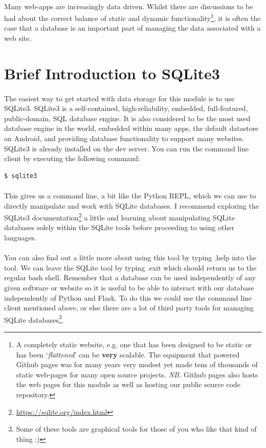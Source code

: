\documentclass[12pt, a4paper, oneside]{book}
\begin{document}
\paragraph{} Many web-apps are increasingly data driven. Whilst there are discussions to be had about the correct balance of static and dynamic functionality\footnote{A completely static website, e.g. one that has been designed to be static or has been `\emph{flattened}' can be {\bf{very}} scalable. The equipment that powered Github pages was for many years very modest yet made tens of thousands of static web-pages for many open source projects. \emph{NB.} Github pages also hosts the web pages for this module as well as hosting our public source code repository.}, it is often the case that a database is an important part of managing the data associated with a web site.

\section{Brief Introduction to SQLite3}
\label{sqlite3-intro}
\paragraph{} The easiest way to get started with data storage for this module is to use SQLite3. SQLite3 is a self-contained, high-reliability, embedded, full-featured, public-domain, SQL database engine. It is also considered to be the most used database engine in the world, embedded within many apps, the default datastore on Android, and providing database functionality to support many websites. SQLite3 is already installed on the dev server. You can run the command line client by executing the following command:

\begin{lstlisting}[style=DOS]
    $ sqlite3
\end{lstlisting}

\paragraph{} This gives us a command line, a bit like the Python REPL, which we can use to directly manipulate and work with SQLite databases. I recommend exploring the SQLite3 documentation\footnote{\url{https://sqlite.org/index.html}} a little and learning about manipulating SQLite databases solely within the SQLite tools before proceeding to using other languages. 

\paragraph{} You can also find out a little more about using this tool by typing .help into the tool. We can leave the SQLite tool by typing .exit which should return us to the regular bash shell. Remember that a database can be used independently of any given software or website so it is useful to be able to interact with our database independently of Python and Flask. To do this we could use the command line client mentioned above, or else there are a lot of third party tools for managing SQLite databases\footnote{Some of these tools are graphical tools for those of you who like that kind of thing ;)}.
\end{document}
